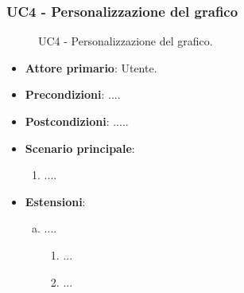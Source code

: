 \subsubsection{UC4 - Personalizzazione del grafico}
\begin{figure}[h]
\centering
\caption{UC4 - Personalizzazione del grafico.}
\end{figure}
\begin{itemize}
	\item \textbf{Attore primario}: Utente.
	\item \textbf{Precondizioni}: ....
	\item \textbf{Postcondizioni}: .....
	\item \textbf{Scenario principale}:
		\begin{enumerate}
			\item ....
		\end{enumerate}
	\item \textbf{Estensioni}:
	\begin{enumerate}[(a)]
		\item ....
		\begin{enumerate}[1.]
			\item ...
			\item ...
		\end{enumerate}
	\end{enumerate}
\end{itemize}